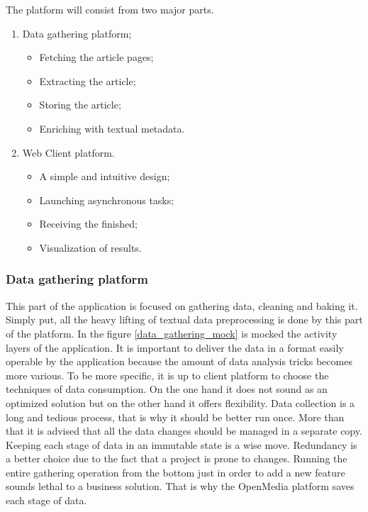 The platform will consist from two major parts.
\begin{enumerate}
    \item Data gathering platform;
    \begin{itemize}
        \item Fetching the article pages;
        \item Extracting the article;
        \item Storing the article;
        \item Enriching with textual metadata.
    \end{itemize}
    \item Web Client platform.
    \begin{itemize}
        \item A simple and intuitive design;
        \item Launching asynchronous tasks;
        \item Receiving the finished;
        \item Visualization of results.
    \end{itemize}
\end{enumerate}

\subsubsection{Data gathering platform}
This part of the application is focused on gathering data, cleaning and baking it. Simply put, all the heavy lifting of textual data preprocessing is done by this part of the platform. In the figure \ref{data_gathering_mock} is mocked the activity layers of the application. It is important to deliver the data in a format easily operable by the application because the amount of data analysis tricks becomes more various. To be more specific, it is up to client platform to choose the techniques of data consumption. On the one hand it does not sound as an optimized solution but on the other hand it offers flexibility. Data collection is a long and tedious process, that is why it should be better run once. More than that it is advised that all the data changes should be managed in a separate copy. Keeping each stage of data in an immutable state is a wise move. Redundancy is a better choice due to the fact that a project is prone to changes. Running the entire gathering operation from the bottom just in order to add a new feature sounds lethal to a business solution. That is why the OpenMedia platform saves each stage of data.

